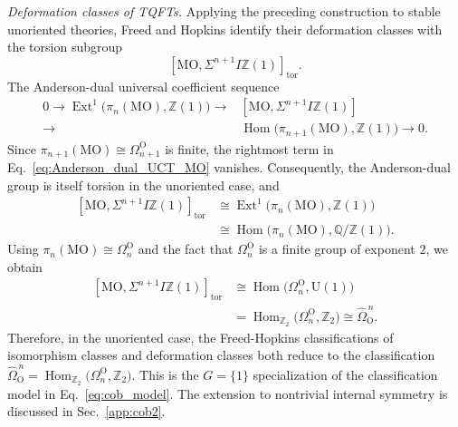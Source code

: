 \documentclass[aps,prx,reprint,superscriptaddress,twocolumn,amsmath,amssymb,amsfonts, nofootinbib]{revtex4-2}
\newcommand{\Z}{\mathbb{Z}}
\theoremstyle{apsstyle}
\begin{document}
\bigskip 

\noindent \textit{Deformation classes of TQFTs.} Applying the preceding construction to stable unoriented theories, Freed and Hopkins identify their deformation classes with the torsion subgroup
\begin{equation}
    \left[
        \mathrm{MO},
        \Sigma^{n+1}I\mathbb Z(1)
    \right]_{\mathrm{tor}}.
    \label{eq:FH_deformation_classification}
\end{equation}
The Anderson-dual universal coefficient sequence 
\begin{align}
\nonumber
0\longrightarrow
\operatorname{Ext}^{1}
\bigl(\pi_n(\mathrm{MO}),\mathbb Z(1)\bigr)
\longrightarrow
&\left[
    \mathrm{MO},
    \Sigma^{n+1}I\mathbb Z(1)
\right]
\\
\longrightarrow&\operatorname{Hom}
\bigl(\pi_{n+1}(\mathrm{MO}),\mathbb Z(1)\bigr)
\longrightarrow 0.
\label{eq:Anderson_dual_UCT_MO}
\end{align}
Since $\pi_{n+1}(\mathrm{MO})\cong\Omega_{n+1}^{\mathrm O}$ is finite,
the rightmost term in Eq.~\eqref{eq:Anderson_dual_UCT_MO} vanishes.
Consequently, the Anderson-dual group is itself torsion in the
unoriented case, and
\begin{equation}
\begin{aligned}
    \left[
        \mathrm{MO},
        \Sigma^{n+1}I\mathbb Z(1)
    \right]_{\mathrm{tor}}
    &\cong
    \operatorname{Ext}^{1}
    \bigl(\pi_n(\mathrm{MO}),\mathbb Z(1)\bigr)\\
    &\cong
    \operatorname{Hom}
    \bigl(\pi_n(\mathrm{MO}),\mathbb Q/\mathbb Z(1)\bigr).
\end{aligned}
\label{eq:Anderson_dual_torsion_computation}
\end{equation}
Using
$\pi_n(\mathrm{MO})\cong\Omega_n^{\mathrm O}$ and the fact that
$\Omega_n^{\mathrm O}$ is a finite group of exponent $2$, we obtain
\begin{equation}
\begin{aligned}
    \left[
        \mathrm{MO},
        \Sigma^{n+1}I\mathbb Z(1)
    \right]_{\mathrm{tor}}
    &\cong
    \operatorname{Hom}
    \bigl(\Omega_n^{\mathrm O},\mathrm U(1)\bigr)\\
    &=\operatorname{Hom}_{\Z_{2}}
    \bigl(\Omega_n^{\mathrm O},\Z_{2}\bigr)\cong
    \widehat{\Omega}_{\mathrm O}^{\,n}.
\end{aligned}
\label{eq:FH_deformation_Kapustin_comparison}
\end{equation}
Therefore, in the unoriented case, the Freed-Hopkins classifications of isomorphism classes and deformation classes both reduce to the classification $\widehat{\Omega}_{\mathrm O}^{\,n} = \operatorname{Hom}_{\Z_{2}} \bigl(\Omega_n^{\mathrm O},\Z_{2}\bigr)$. This is the $G=\{1\}$ specialization of the classification model in Eq.~\eqref{eq:cob_model}. The extension to nontrivial internal symmetry is discussed in Sec.~\ref{app:cob2}.
\end{document}
